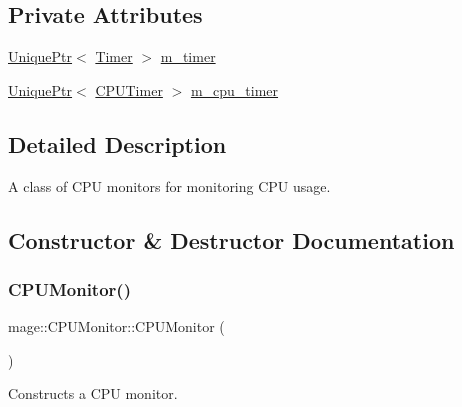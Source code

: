 \subsection*{Private Attributes}
\begin{DoxyCompactItemize}
\item 
\hyperlink{namespacemage_a8c307fbcc33bce9b7f2aa4c26c3b95cf}{Unique\+Ptr}$<$ \hyperlink{classmage_1_1_timer}{Timer} $>$ \hyperlink{classmage_1_1_c_p_u_monitor_a5d24b6b9d684a6d0c34175052a8ac850}{m\+\_\+timer}
\item 
\hyperlink{namespacemage_a8c307fbcc33bce9b7f2aa4c26c3b95cf}{Unique\+Ptr}$<$ \hyperlink{classmage_1_1_c_p_u_timer}{C\+P\+U\+Timer} $>$ \hyperlink{classmage_1_1_c_p_u_monitor_a925f9d2366d798f2dba783a3ab25f651}{m\+\_\+cpu\+\_\+timer}
\end{DoxyCompactItemize}


\subsection{Detailed Description}
A class of C\+PU monitors for monitoring C\+PU usage. 

\subsection{Constructor \& Destructor Documentation}
\hypertarget{classmage_1_1_c_p_u_monitor_a06f9aa6e78b6659617345784f874dec6}{}\label{classmage_1_1_c_p_u_monitor_a06f9aa6e78b6659617345784f874dec6} 
\subsubsection{\texorpdfstring{C\+P\+U\+Monitor()}{CPUMonitor()}\hspace{0.1cm}{\footnotesize\ttfamily [1/3]}}
{\footnotesize\ttfamily mage\+::\+C\+P\+U\+Monitor\+::\+C\+P\+U\+Monitor (\begin{DoxyParamCaption}{ }\end{DoxyParamCaption})}

Constructs a C\+PU monitor. \hypertarget{classmage_1_1_c_p_u_monitor_a381bdfa95b34c591c6fbdb184e889f88}{}\label{classmage_1_1_c_p_u_monitor_a381bdfa95b34c591c6fbdb184e889f88} 
